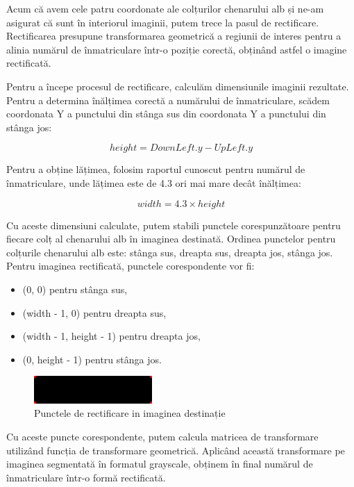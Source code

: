 \documentclass[a4paper,12pt]{report}
\begin{document}
Acum că avem cele patru coordonate ale colțurilor chenarului alb și ne-am asigurat că sunt în interiorul imaginii, putem trece la pasul de rectificare. Rectificarea presupune transformarea geometrică a regiunii de interes pentru a alinia numărul de înmatriculare într-o poziție corectă, obținând astfel o imagine rectificată.

Pentru a începe procesul de rectificare, calculăm dimensiunile imaginii rezultate. Pentru a determina înălțimea corectă a numărului de înmatriculare, scădem coordonata Y a punctului din stânga sus din coordonata Y a punctului din stânga jos:

\[
    height = DownLeft.y - UpLeft.y
\]

Pentru a obține lățimea, folosim raportul cunoscut pentru numărul de înmatriculare, unde lățimea este de 4.3 ori mai mare decât înălțimea:

\[
    width = 4.3 \times height
\]

Cu aceste dimensiuni calculate, putem stabili punctele corespunzătoare pentru fiecare colț al chenarului alb în imaginea destinată. Ordinea punctelor pentru colțurile chenarului alb este: stânga sus, dreapta sus, dreapta jos, stânga jos. Pentru imaginea rectificată, punctele corespondente vor fi:

\begin{itemize}[itemsep=5pt, parsep=0pt]
    \item (0, 0) pentru stânga sus,
    \item (width - 1, 0) pentru dreapta sus,
    \item (width - 1, height - 1) pentru dreapta jos,
    \item (0, height - 1) pentru stânga jos.
\end{itemize}

\begin{figure}[h]
    \centering
    \includegraphics[width=0.4\textwidth]{images/points_on_black.jpg}
    \caption{Punctele de rectificare in imaginea destinație}
\end{figure}
\FloatBarrier

Cu aceste puncte corespondente, putem calcula matricea de transformare utilizând funcția de transformare geometrică. Aplicând această transformare pe imaginea segmentată în formatul grayscale, obținem în final numărul de înmatriculare într-o formă rectificată.
\end{document}
